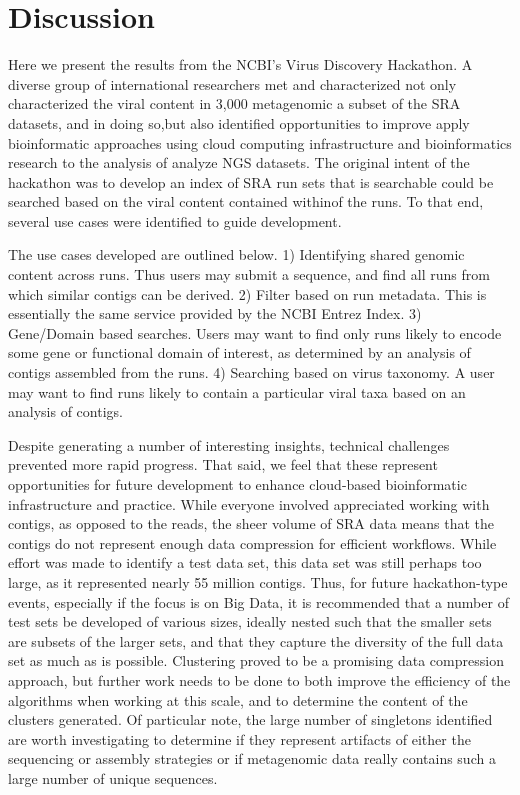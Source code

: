 \section{Discussion}
Here we present the results from the NCBI's Virus Discovery Hackathon. A
diverse group of international researchers met and  characterized not only
characterized the viral content in 3,000 metagenomic a subset of the SRA
datasets, and in doing so,but also identified opportunities to improve apply
bioinformatic approaches using cloud computing infrastructure and
bioinformatics research to the analysis of analyze NGS datasets. The original
intent of the hackathon was to develop an index of SRA run sets that is
searchable could be searched based on the viral content contained withinof the
runs. To that end, several use cases were identified to guide development.

The use cases developed are outlined below. 1) Identifying shared genomic
content across runs. Thus users may submit a sequence, and find all runs from
which similar contigs can be derived. 2) Filter based on run metadata. This is
essentially the same service provided by the NCBI Entrez Index. 3) Gene/Domain
based searches. Users may want to find only runs likely to encode some gene or
functional domain of interest, as determined by an analysis of contigs
assembled from the runs. 4) Searching based on virus taxonomy. A user may want
to find runs likely to contain a particular viral taxa based on an analysis of
contigs.

Despite generating a number of interesting insights, technical challenges
prevented more rapid progress. That said, we feel that these represent
opportunities for future development to enhance cloud-based bioinformatic
infrastructure and practice. While everyone involved appreciated working with
contigs, as opposed to the reads, the sheer volume of SRA data means that the
contigs do not represent enough data compression for efficient workflows. While
effort was made to identify a test data set, this data set was still perhaps
too large, as it represented nearly 55 million contigs. Thus, for future
hackathon-type events, especially if the focus is on Big Data, it is
recommended that a number of test sets be developed of various sizes, ideally
nested such that the smaller sets are subsets of the larger sets, and that they
capture the diversity of the full data set as much as is possible. Clustering
proved to be a promising data compression approach, but further work needs to
be done to both improve the efficiency of the algorithms when working at this
scale, and to determine the content of the clusters generated. Of particular
note, the large number of singletons identified are worth investigating to
determine if they represent artifacts of either the sequencing or assembly
strategies or if metagenomic data really contains such a large number of unique
sequences.

